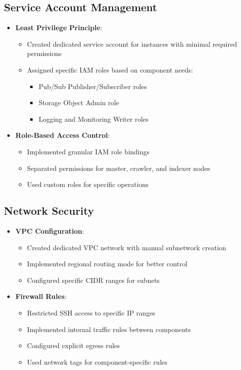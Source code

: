 \documentclass[12pt,a4paper]{report}
\begin{document}
\subsection{Service Account Management}
\begin{itemize}
\item \textbf{Least Privilege Principle}:
    \begin{itemize}
        \item Created dedicated service account for instances with minimal required permissions
        \item Assigned specific IAM roles based on component needs:
            \begin{itemize}
                \item Pub/Sub Publisher/Subscriber roles
                \item Storage Object Admin role
                \item Logging and Monitoring Writer roles
            \end{itemize}
    \end{itemize}
\item \textbf{Role-Based Access Control}:
    \begin{itemize}
        \item Implemented granular IAM role bindings
        \item Separated permissions for master, crawler, and indexer nodes
        \item Used custom roles for specific operations
    \end{itemize}
\end{itemize}

\subsection{Network Security}
\begin{itemize}
\item \textbf{VPC Configuration}:
    \begin{itemize}
        \item Created dedicated VPC network with manual subnetwork creation
        \item Implemented regional routing mode for better control
        \item Configured specific CIDR ranges for subnets
    \end{itemize}
\item \textbf{Firewall Rules}:
    \begin{itemize}
        \item Restricted SSH access to specific IP ranges
        \item Implemented internal traffic rules between components
        \item Configured explicit egress rules
        \item Used network tags for component-specific rules
    \end{itemize}
\end{itemize}
\end{document}
